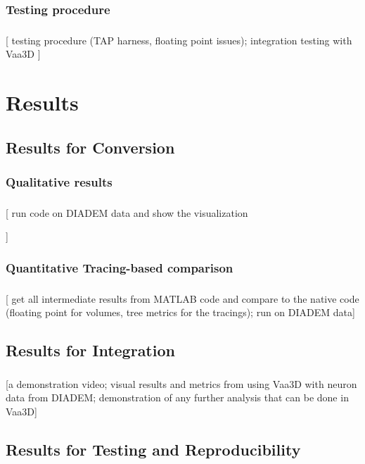 \documentclass{beamer}
\newcommand{\tmetrics}[1]{#1}
\newcommand{\tmetrics}[1]{\textcolor{tmetrics}{#1}}
\begin{document}
\subsubsection{Testing procedure}
\begin{frame}\frametitle{\subsubsecname}
	[
		testing procedure (TAP harness, floating point
		issues); integration testing with Vaa3D
	]
\end{frame}

\section{Results}

\subsection{Results for Conversion}

\subsubsection{Qualitative results}
\begin{frame}\frametitle{\subsecname}
	[
		\tmetrics{%
			run code on DIADEM data and show the
			visualization
		}
	]
\end{frame}

\subsubsection{Quantitative Tracing-based comparison}
\begin{frame}\frametitle{\subsecname}
	[ get all intermediate results from MATLAB code and
	compare to the native code (floating point for volumes,
	tree metrics for the tracings); run on DIADEM data]
\end{frame}

\subsection{Results for Integration}
\begin{frame}\frametitle{\subsecname}
	[\tmetrics{a demonstration video; visual results and metrics from using
			Vaa3D with neuron data from DIADEM; demonstration of any further analysis
	that can be done in Vaa3D}]

\end{frame}

\subsection{Results for Testing and Reproducibility}
\end{document}
